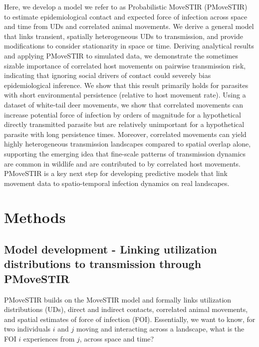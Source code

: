 \documentclass[letterpaper]{article}
\begin{document}
Here, we develop a model we refer to as Probabilistic MoveSTIR (PMoveSTIR) to estimate epidemiological contact and expected force of infection across space and time from UDs and correlated animal movements. We derive a general model that links transient, spatially heterogeneous UDs to transmission, and provide modifications to consider stationarity in space or time.
Deriving analytical results and applying PMoveSTIR to simulated data, we demonstrate the sometimes sizable importance of correlated host movements on pairwise transmission risk, indicating that ignoring social drivers of contact could severely bias epidemiological inference. We show that this result primarily holds for parasites with short environmental persistence (relative to host movement rate). %
Using a dataset of white-tail deer movements, we show that correlated movements can increase potential force of infection by orders of magnitude for a hypothetical directly transmitted parasite but are relatively unimportant for a hypothetical parasite with long persistence times. Moreover, correlated movements can yield highly heterogeneous transmission landscapes compared to spatial overlap alone, supporting the emerging idea that fine-scale patterns of transmission dynamics are common in wildlife \citep{Albery2021} and are contributed to by correlated host movements. PMoveSTIR is a key next step for developing predictive models that link movement data to spatio-temporal infection dynamics on real landscapes.


\section*{Methods}

\subsection*{Model development - Linking utilization distributions to transmission through PMoveSTIR}

PMoveSTIR builds on the MoveSTIR model \citep{Wilber2022} and formally links utilization distributions (UDs), direct and indirect contacts, correlated animal movements, and spatial estimates of force of infection (FOI). Essentially, we want to know, for two individuals $i$ and $j$ moving and interacting across a landscape, what is the FOI $i$ experiences from $j$, across space and time?  
\end{document}
